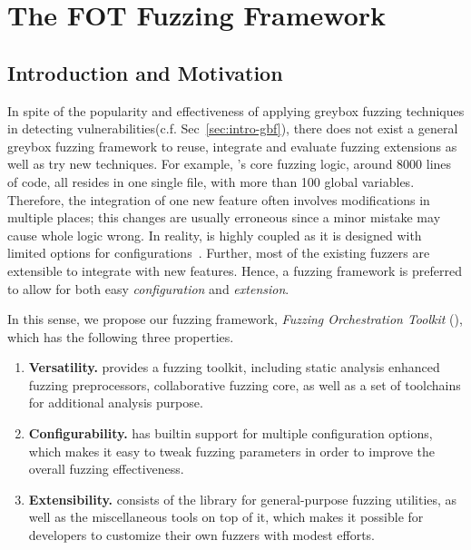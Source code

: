 
\chapter{The FOT Fuzzing Framework} \label{ch:fot}


\section{Introduction and Motivation}


In spite of the popularity and effectiveness of applying greybox fuzzing techniques in detecting vulnerabilities(c.f. Sec~\ref{sec:intro-gbf}), there does not exist a general greybox fuzzing framework to reuse, integrate and evaluate fuzzing extensions as well as try new techniques.
For example, {\AFL}'s core fuzzing logic, around 8000 lines of code, all resides in one single file, with more than 100 global variables. Therefore, the integration of one new feature often involves modifications in multiple places; this changes are usually erroneous since a minor mistake may cause whole logic wrong.
In reality, {\AFL} is highly coupled as it is designed with limited options for configurations~\cite{afl}.
Further, most of the existing fuzzers are extensible to integrate with new features.
Hence, a fuzzing framework is preferred to allow for both easy \emph{configuration} and \emph{extension}.


In this sense, we propose our fuzzing framework, \emph{Fuzzing Orchestration Toolkit} ({\FOT}), which has the following three properties.

\begin{enumerate}[(1)]
\item  \textbf{Versatility.}
{\FOT} provides a fuzzing toolkit, including static analysis enhanced fuzzing preprocessors, collaborative fuzzing core, as well as a set of toolchains for additional analysis purpose.
\item \textbf{Configurability.}
{\FOT} has builtin support for multiple configuration options, which makes it easy to tweak fuzzing parameters in order to improve the overall fuzzing effectiveness.
\item \textbf{Extensibility.}
{\FOT} consists of the library for general-purpose fuzzing utilities, as well as the miscellaneous tools on top of it, which makes it possible for developers to customize their own fuzzers with modest efforts.
\end{enumerate}


